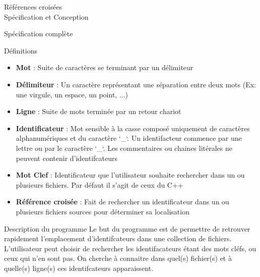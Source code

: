 \documentclass{article}
\begin{document}
\begin{center} 
\Huge{Références croisées \\ Spécification et Conception}
\end{center}



\begin{section}{Spécification complète}


  \begin{subsection}{Définitions}

    \begin{itemize}

      \item \textbf{Mot} : Suite de caractères se terminant par un délimiteur

      \item \textbf{Délimiteur} : Un caractère représentant une séparation entre deux mots (Ex: une virgule, un espace, un point, ...) 

      \item \textbf{Ligne} : Suite de mots terminée par un retour chariot

      \item \textbf{Identificateur} : Mot sensible à la casse composé uniquement de caractères alphanumériques et du caractère `\_`. 
				      Un identifacteur commence par une lettre ou par le caractère `\_`.
				      Les commentaires ou chaines litérales ne peuvent contenir d'identifcateurs
				     
      \item \textbf{Mot Clef} : Identificateur que l'utilisateur souhaite rechercher dans un ou plusieurs fichiers. Par défaut il s'agit de ceux du C++

      \item \textbf{Référence croisée} : Fait de rechercher un identificateur dans un ou plusieurs fichiers sources pour déterminer sa localisation
    \end{itemize}

  \end{subsection}


  \begin{subsection}{Description du programme}
    Le but du programme est de permettre de retrouver rapidement l'emplacement d'identifcateurs dans une collection de fichiers.
    L'utilisateur peut choisir de rechercher les identifacateurs étant des mots cléfs, ou ceux qui n'en sont pas.
    On cherche à connaitre dans quel(s) fichier(s) et à quelle(s) ligne(s) ces identifcateurs apparaissent.
    

\end{subsection}
\end{section}
\end{document}
